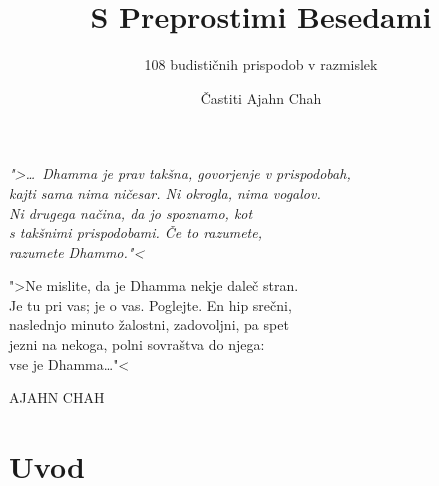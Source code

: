 \documentclass[11pt,twoside,final]{memoir}
\title{S Preprostimi Besedami}
\subtitle{108 budističnih prispodob v razmislek}
\author{Častiti Ajahn Chah}
\date{}
\begin{document}
\thispagestyle{empty}
\mbox{}
\clearpage

\thispagestyle{empty}
\mbox{}
\clearpage


\frontmatter*

\thispagestyle{empty}



\cleartoverso
\thispagestyle{empty}



\clearpage
\thispagestyle{empty}

\begin{quotepage}{\linewidth}
\centering \itshape
">\ldots{} Dhamma je prav takšna, govorjenje v prispodobah,\\
kajti sama nima ničesar. Ni okrogla, nima vogalov.\\
Ni drugega načina, da jo spoznamo, kot\\
s takšnimi prispodobami. Če to razumete,\\
razumete Dhammo."<

">Ne mislite, da je Dhamma nekje daleč stran.\\
Je tu pri vas; je o vas. Poglejte. En hip srečni,\\
naslednjo minuto žalostni, zadovoljni, pa spet\\
jezni na nekoga, polni sovraštva do njega:\\
vse je Dhamma\ldots{}"<

{\upshape AJAHN CHAH}
\end{quotepage}

\clearpage
\thispagestyle{empty}



\cleartorecto
\tableofcontents*



\chapter{Uvod}

\end{document}
